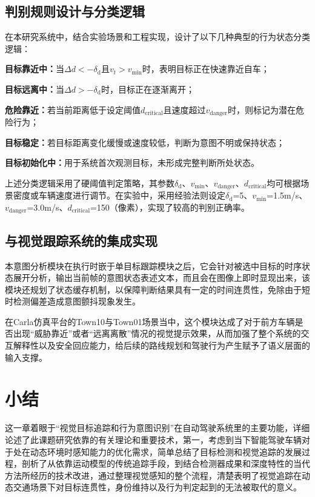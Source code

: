 \subsection{判别规则设计与分类逻辑}

在本研究系统中，结合实验场景和工程实现，设计了以下几种典型的行为状态分类逻辑：

\textbf{目标靠近中：}当$\Delta d < -\delta_{\mathrm{d}}$且$v_t>v_{\text{min}}$时，表明目标正在快速靠近自车；

\textbf{目标远离中：}当$\Delta d > -\delta_{\mathrm{d}}$时，目标正在逐渐离开；

\textbf{危险靠近：}若当前距离低于设定阈值$d_{\text{critical}}$且速度超过$v_{\text{danger}}$时，则标记为潜在危险行为；

\textbf{目标稳定：}若目标距离变化缓慢或速度较低，判断为意图不明或保持状态；

\textbf{目标初始化中：}用于系统首次观测目标，未形成完整判断所处状态。

上述分类逻辑采用了硬阈值判定策略，其参数$\delta_{\mathrm{d}}$、$v_{\text{min}}$、$v_{\text{danger}}$、$d_{\text{critical}}$均可根据场景密度或车辆速度进行调节。在实验中，采用经验法则设定$\delta_{\mathrm{d}}$=5、$v_{\text{min}}$=1.5m/s、$v_{\text{danger}}$=3.0m/s、$d_{\text{critical}}$=150（像素），实现了较高的判别正确率。

\subsection{与视觉跟踪系统的集成实现}

本意图分析模块在执行时嵌于单目标跟踪模块之后，它会针对被选中目标的时序状态展开分析，输出当前帧的意图状态表述文本，而且会在图像上即时显现出来，该模块还规划了状态缓存机制，以保障判断结果具有一定的时间连贯性，免除由于短时检测偏差造成意图颤抖现象发生。

在Carla仿真平台的Town10与Town01场景当中，这个模块达成了对于前方车辆是否出现“威胁靠近”或者“远离离散”情况的视觉提示效果，从而加强了整个系统的交互解释性以及安全回应能力，给后续的路线规划和驾驶行为产生赋予了语义层面的输入支撑。

\section{小结}

这一章着眼于“视觉目标追踪和行为意图识别”在自动驾驶系统里的主要功能，详细论述了此课题研究依靠的有关理论和重要技术，第一，考虑到当下智能驾驶车辆对于处在动态环境时感知能力的优化需求，简单总结了目标检测和视觉追踪的发展过程，剖析了从依靠运动模型的传统追踪手段，到结合检测器成果和深度特性的当代方法所经历的技术改进，通过整理视觉感知的整个流程，清楚表明了视觉追踪在动态交通场景下对目标连贯性，身份维持以及行为判定起到的无法被取代的意义。

